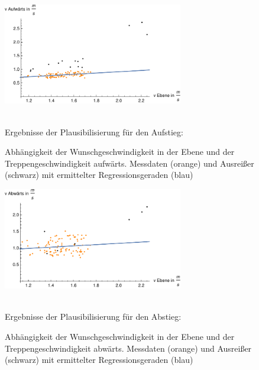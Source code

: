 \begin{figure}[htpb]
\centering
\includegraphics[width=0.7\textwidth]{abbildungen/regression/2012_2017_verbund/ohneausreisser/auf-ebene.pdf}
\caption{Abhängigkeit der Wunschgeschwindigkeit in der Ebene und der Treppengeschwindigkeit aufwärts. Messdaten (orange) und Ausreißer (schwarz) mit ermittelter Regressionsgeraden (blau)}
\label{fig:2012_und_2017_OA_auf_ebene}
\justify \ \\
Ergebnisse der Plausibilisierung für den Aufstieg:

\end{figure}

\begin{figure}[htpb]
\centering
\includegraphics[width=0.7\textwidth]{abbildungen/regression/2012_2017_verbund/ohneausreisser/ab-ebene.pdf}
\caption{Abhängigkeit der Wunschgeschwindigkeit in der Ebene und der Treppengeschwindigkeit abwärts. Messdaten (orange) und Ausreißer (schwarz) mit ermittelter Regressionsgeraden (blau)}
\label{fig:2012_und_2017_OA_ab_ebene}
\justify \ \\
Ergebnisse der Plausibilisierung für den Abstieg:

\end{figure}













